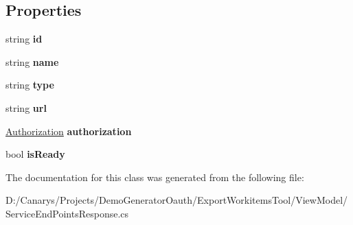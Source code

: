 \subsection*{Properties}
\begin{DoxyCompactItemize}
\item 
\mbox{\label{class_templates_generator_tool_1_1_view_model_1_1_service_end_points_response_1_1_value_af4e1f7cf94cf943081056566cc375942}} 
string {\bfseries id}
\item 
\mbox{\label{class_templates_generator_tool_1_1_view_model_1_1_service_end_points_response_1_1_value_a2a356b27524d3be69b63112eff9b7bf7}} 
string {\bfseries name}
\item 
\mbox{\label{class_templates_generator_tool_1_1_view_model_1_1_service_end_points_response_1_1_value_a5c7a2ed5d0a9b58ed446539fd11f782e}} 
string {\bfseries type}
\item 
\mbox{\label{class_templates_generator_tool_1_1_view_model_1_1_service_end_points_response_1_1_value_a9c91335bfaf5f073dfd682447748f339}} 
string {\bfseries url}
\item 
\mbox{\label{class_templates_generator_tool_1_1_view_model_1_1_service_end_points_response_1_1_value_a766f0fdaa0a599f29d19e1294af65ed0}} 
\mbox{\hyperlink{class_templates_generator_tool_1_1_view_model_1_1_service_end_points_response_1_1_authorization}{Authorization}} {\bfseries authorization}
\item 
\mbox{\label{class_templates_generator_tool_1_1_view_model_1_1_service_end_points_response_1_1_value_a6e04a5a66a805992bd58ca8804e42e73}} 
bool {\bfseries is\+Ready}
\end{DoxyCompactItemize}


The documentation for this class was generated from the following file\+:\begin{DoxyCompactItemize}
\item 
D\+:/\+Canarys/\+Projects/\+Demo\+Generator\+Oauth/\+Export\+Workitems\+Tool/\+View\+Model/Service\+End\+Points\+Response.\+cs\end{DoxyCompactItemize}
